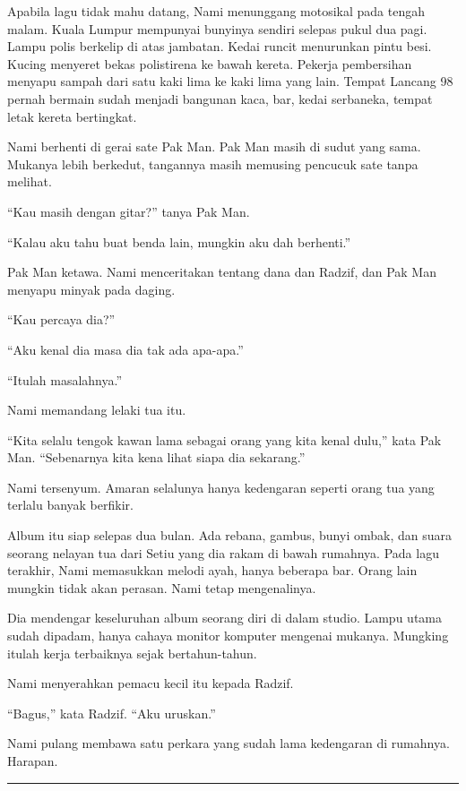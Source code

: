 \documentclass[
  11pt,
  a5paper,
  openany,
  oneside]{book}
\begin{document}
Apabila lagu tidak mahu datang, Nami menunggang motosikal pada tengah
malam. Kuala Lumpur mempunyai bunyinya sendiri selepas pukul dua pagi.
Lampu polis berkelip di atas jambatan. Kedai runcit menurunkan pintu
besi. Kucing menyeret bekas polistirena ke bawah kereta. Pekerja
pembersihan menyapu sampah dari satu kaki lima ke kaki lima yang lain.
Tempat Lancang 98 pernah bermain sudah menjadi bangunan kaca, bar, kedai
serbaneka, tempat letak kereta bertingkat.

Nami berhenti di gerai sate Pak Man. Pak Man masih di sudut yang sama.
Mukanya lebih berkedut, tangannya masih memusing pencucuk sate tanpa
melihat.

``Kau masih dengan gitar?'' tanya Pak Man.

``Kalau aku tahu buat benda lain, mungkin aku dah berhenti.''

Pak Man ketawa. Nami menceritakan tentang dana dan Radzif, dan Pak Man
menyapu minyak pada daging.

``Kau percaya dia?''

``Aku kenal dia masa dia tak ada apa-apa.''

``Itulah masalahnya.''

Nami memandang lelaki tua itu.

``Kita selalu tengok kawan lama sebagai orang yang kita kenal dulu,''
kata Pak Man. ``Sebenarnya kita kena lihat siapa dia sekarang.''

Nami tersenyum. Amaran selalunya hanya kedengaran seperti orang tua yang
terlalu banyak berfikir.

Album itu siap selepas dua bulan. Ada rebana, gambus, bunyi ombak, dan
suara seorang nelayan tua dari Setiu yang dia rakam di bawah rumahnya.
Pada lagu terakhir, Nami memasukkan melodi ayah, hanya beberapa bar.
Orang lain mungkin tidak akan perasan. Nami tetap mengenalinya.

Dia mendengar keseluruhan album seorang diri di dalam studio. Lampu
utama sudah dipadam, hanya cahaya monitor komputer mengenai mukanya.
Mungking itulah kerja terbaiknya sejak bertahun-tahun.

Nami menyerahkan pemacu kecil itu kepada Radzif.

``Bagus,'' kata Radzif. ``Aku uruskan.''

Nami pulang membawa satu perkara yang sudah lama kedengaran di rumahnya.
Harapan.

\begin{center}\rule{0.5\linewidth}{0.5pt}\end{center}
\end{document}
